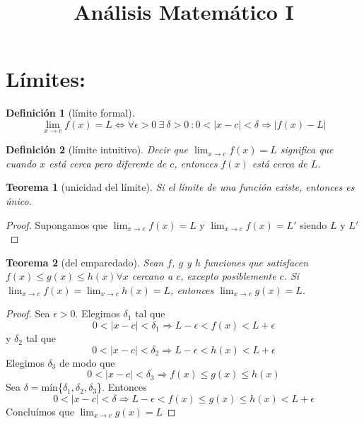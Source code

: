 \documentclass{article}
\title{Análisis Matemático I}
\date{}
\author{}
\newtheorem*{theorem}{Teorema}
\newtheorem*{definition}{Definición}
\begin{document}
  \maketitle
  \section*{Límites:} 
    \begin{definition}[límite formal]
      \[
        \lim_{x\to c}f(x)=L\iff\forall\epsilon>0 \ \exists\ \delta>0\ :0<|x-c|<\delta\Longrightarrow
        |f(x)-L| 
      \]
    \end{definition}
    \begin{definition}[límite intuitivo]
      Decir que $\lim_{x\to c}f(x)=L$ significa  que cuando $x$ está cerca pero diferente de $c$,
      entonces $f(x)$ está cerca de $L$.
    \end{definition}
    \begin{theorem}[unicidad del límite]
      Si el límite de una función existe, entonces es único.
    \end{theorem}
    \begin{proof}
      Supongamos que $\lim_{x\to c}f(x)=L$ y  $\lim_{x\to c}f(x)=L'$ siendo $L$ y $L'$
    \end{proof}
    \begin{theorem}[del emparedado]
      Sean $f$, $g$ y $h$ funciones que satisfacen $f(x)\leqslant g(x)\leqslant h(x)\forall x$
      cercano a $c$, excepto posiblemente $c$. Si $\lim_{x\to c}f(x)=\lim_{x\to c}h(x)=L$, entonces
      $\lim_{x\to c}g(x)=L$.
    \end{theorem}
    \begin{proof}
      Sea $\epsilon>0$. Elegimos $\delta_1$ tal que
      \[
        0<|x-c|<\delta_1\Longrightarrow L-\epsilon<f(x)<L+\epsilon
      \]
      y $\delta_2$ tal que
      \[
        0<|x-c|<\delta_2\Longrightarrow L-\epsilon<h(x)<L+\epsilon
      \]
      Elegimos $\delta_3$ de modo que
      \[
        0<|x-c|<\delta_3\Longrightarrow f(x)\leqslant g(x)\leqslant h(x)
      \]
      Sea $\delta=$mín\{$\delta_1,\delta_2,\delta_3$\}. Entonces
      \[
        0<|x-c|<\delta\Longrightarrow L-\epsilon<f(x)\leqslant g(x)\leqslant h(x)<L+\epsilon
      \]
      Concluímos que $\lim_{x\to c}g(x)=L$
    \end{proof}
    \newpage
\end{document}
